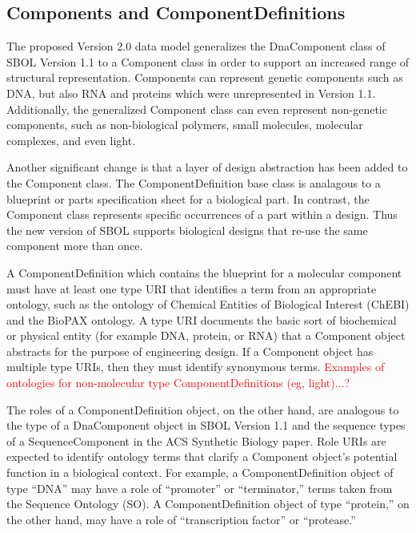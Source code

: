 \documentclass[draftspec]{sbmlpkgspec}
\begin{document}
\subsection{Components and ComponentDefinitions}

The proposed Version 2.0 data model generalizes the DnaComponent class of SBOL Version 1.1 to a Component class in order to support an increased range of structural representation. Components can represent genetic components such as DNA, but also RNA and proteins which were unrepresented in Version 1.1.  Additionally, the generalized Component class can even represent non-genetic components, such as non-biological polymers, small molecules, molecular complexes, and even light.

Another significant change is that a layer of design abstraction has been added to the Component class.  The ComponentDefinition base class is analagous to a blueprint or parts specification sheet for a biological part.  In contrast, the Component class represents specific occurrences of a part within a design.  Thus the new version of SBOL supports biological designs that re-use the same component more than once. 

A ComponentDefinition which contains the blueprint for a molecular component must have at least one type URI that identifies a term from an appropriate ontology, such as the ontology of Chemical Entities of Biological Interest (ChEBI) and the BioPAX ontology. A type URI documents the basic sort of biochemical or physical entity (for example DNA, protein, or RNA) that a Component object abstracts for the purpose of engineering design. If a Component object has multiple type URIs, then they must identify synonymous terms.
\textcolor{red}{Examples of ontologies for non-molecular type ComponentDefinitions (eg, light)...?}

The roles of a ComponentDefinition object, on the other hand, are analogous to the type of a DnaComponent object in SBOL Version 1.1 and the sequence types of a SequenceComponent in the ACS Synthetic Biology paper. Role URIs are expected to identify ontology terms that clarify a Component object’s potential function in a biological context. For example, a ComponentDefinition object of type “DNA” may have a role of “promoter” or “terminator,” terms taken from the Sequence Ontology (SO). A ComponentDefinition object of type “protein,” on the other hand, may have a role of “transcription factor” or “protease.” 
\end{document}
